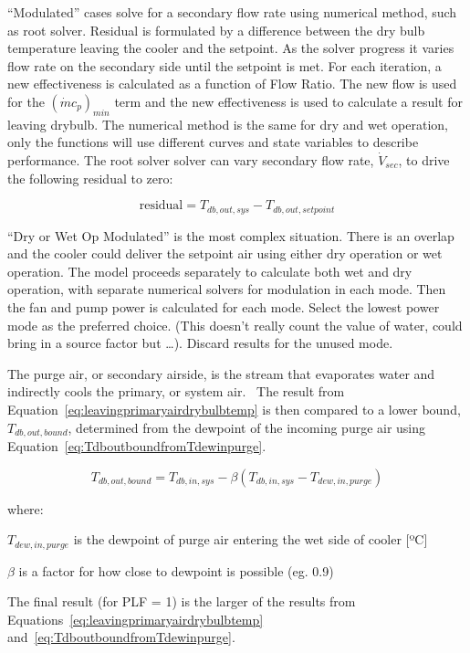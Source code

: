 ``Modulated'' cases solve for a secondary flow rate using numerical method, such as root solver. Residual is formulated by a difference between the dry bulb temperature leaving the cooler and the setpoint. As the solver progress it varies flow rate on the secondary side until the setpoint is met. For each iteration, a new effectiveness is calculated as a function of Flow Ratio. The new flow is used for the \(\left(\dot{m}c_{p}\right)_{min}\) term and the new effectiveness is used to calculate a result for leaving drybulb. The numerical method is the same for dry and wet operation, only the functions will use different curves and state variables to describe performance. The root solver solver can vary secondary flow rate, \(\dot{V}_{sec}\), to drive the following residual to zero:

\begin{equation}
\text{residual} = T_{db,out,sys} - T_{db,out,setpoint}
\end{equation}

``Dry or Wet Op Modulated'' is the most complex situation. There is an overlap and the cooler could deliver the setpoint air using either dry operation or wet operation. The model proceeds separately to calculate both wet and dry operation, with separate numerical solvers for modulation in each mode. Then the fan and pump power is calculated for each mode. Select the lowest power mode as the preferred choice. (This doesn't really count the value of water, could bring in a source factor but \ldots{}). Discard results for the unused mode.

The purge air, or secondary airside, is the stream that evaporates water and indirectly cools the primary, or system air.~ The result from Equation~\ref{eq:leavingprimaryairdrybulbtemp} is then compared to a lower bound, \({T_{db,out,bound}}\), determined from the dewpoint of the incoming purge air using Equation~\ref{eq:TdboutboundfromTdewinpurge}.

\begin{equation}
{T_{db,out,bound}} = {T_{db,in,sys}} - \beta ({T_{db,in,sys}} - {T_{dew,in,purge}})
\label{eq:TdboutboundfromTdewinpurge}
\end{equation}

where:

\({T_{dew,in,purge}}\) is the dewpoint of purge air entering the wet side of cooler {[}ºC{]}

\(\beta\) is a factor for how close to dewpoint is possible (eg. 0.9)

The final result (for PLF = 1) is the larger of the results from Equations~\ref{eq:leavingprimaryairdrybulbtemp} and~\ref{eq:TdboutboundfromTdewinpurge}.

